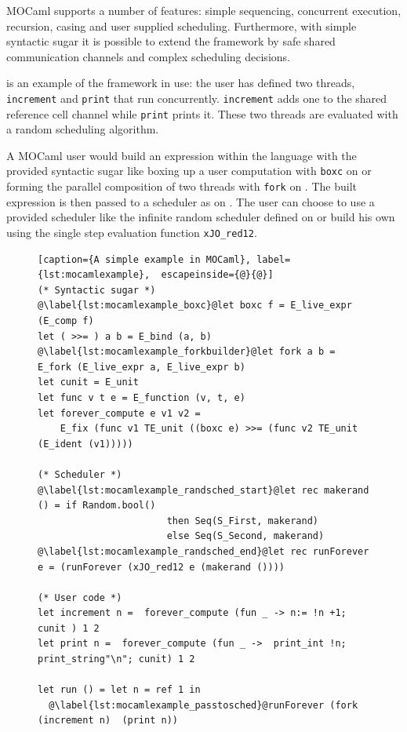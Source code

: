 \documentclass[12pt,twoside,notitlepage]{report}
\theoremstyle{plain}%
\theoremstyle{definition}
\theoremstyle{remark}
\begin{document}
MOCaml supports a number of features: simple sequencing, concurrent execution, recursion, casing and user supplied scheduling. Furthermore, with simple syntactic sugar it is possible to extend the framework by safe shared communication channels and complex scheduling decisions. 

 is an example of the framework in use:  the user has defined two threads, \lstinline|increment| and \lstinline|print| that run concurrently.   \lstinline|increment| adds one to the shared reference cell channel while \lstinline|print| prints it. These two threads are evaluated with a random scheduling algorithm.

A MOCaml user would build an expression within the language with the provided syntactic sugar like boxing up a user computation with \lstinline|boxc| on  or forming the parallel composition of two threads with \lstinline|fork| on . The built expression is then passed to a scheduler as on . The user can choose to use a provided scheduler like the infinite random scheduler defined on  or build his own using the single step evaluation function \lstinline|xJO_red12|.
\begin{figure}[H]
\centering
\begin{lstlisting}[caption={A simple example in MOCaml}, label={lst:mocamlexample},  escapeinside={@}{@}]
(* Syntactic sugar *)
@\label{lst:mocamlexample_boxc}@let boxc f = E_live_expr (E_comp f)
let ( >>= ) a b = E_bind (a, b)
@\label{lst:mocamlexample_forkbuilder}@let fork a b = E_fork (E_live_expr a, E_live_expr b)
let cunit = E_unit
let func v t e = E_function (v, t, e)
let forever_compute e v1 v2 = 
    E_fix (func v1 TE_unit ((boxc e) >>= (func v2 TE_unit (E_ident (v1)))))

(* Scheduler *)
@\label{lst:mocamlexample_randsched_start}@let rec makerand () = if Random.bool() 
                       then Seq(S_First, makerand) 
                       else Seq(S_Second, makerand)
@\label{lst:mocamlexample_randsched_end}@let rec runForever e = (runForever (xJO_red12 e (makerand ())))

(* User code *)
let increment n =  forever_compute (fun _ -> n:= !n +1; cunit ) 1 2
let print n =  forever_compute (fun _ ->  print_int !n; print_string"\n"; cunit) 1 2 

let run () = let n = ref 1 in
  @\label{lst:mocamlexample_passtosched}@runForever (fork (increment n)  (print n))
\end{lstlisting}
\end{figure}
\end{document}
